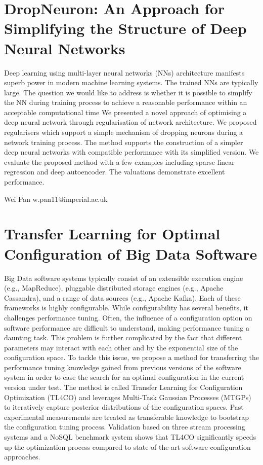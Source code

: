 \documentclass{article}
\begin{document}
\section*{DropNeuron: An Approach for Simplifying the Structure of Deep Neural
Networks}

Deep learning using multi-layer neural networks (NNs) architecture manifests
superb power in modern machine learning systems. The trained NNs are typically
large. The question we would like to address is whether it is possible to
simplify the NN during training process to achieve a reasonable performance
within an acceptable computational time We presented a novel approach of
optimising a deep neural network through regularisation of network architecture.
We proposed regularisers which support a simple mechanism of dropping neurons
during a network training process. The method supports the construction of a
simpler deep neural networks with compatible performance with its simplified
version. We evaluate the proposed method with a few examples including sparse
linear regression and deep autoencoder. The valuations demonstrate excellent
performance.

Wei Pan
w.pan11@imperial.ac.uk

\section*{Transfer Learning for Optimal Configuration of Big Data Software}

Big Data software systems typically consist of an extensible execution engine
(e.g., MapReduce), pluggable distributed storage engines (e.g., Apache
Cassandra), and a range of data sources (e.g., Apache Kafka). Each of these
frameworks is highly configurable. While configurability has several benefits,
it challenges performance tuning. Often, the influence of a configuration option
on software performance are difficult to understand, making performance tuning a
daunting task. This problem is further complicated by the fact that different
parameters may interact with each other and by the exponential size of the
configuration space. To tackle this issue, we propose a method for transferring
the performance tuning knowledge gained from previous versions of the software
system in order to ease the search for an optimal configuration in the current
version under test. The method is called Transfer Learning for Configuration
Optimization (TL4CO) and leverages Multi-Task Gaussian Processes (MTGPs) to
iteratively capture posterior distributions of the configuration spaces. Past
experimental measurements are treated as transferable knowledge to bootstrap the
configuration tuning process. Validation based on three stream processing
systems and a NoSQL benchmark system shows that TL4CO significantly speeds up
the optimization process compared to state-of-the-art software configuration
approaches.
\end{document}
